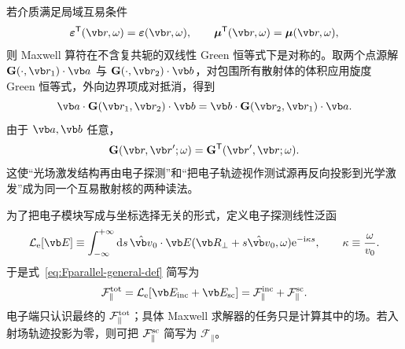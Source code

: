 若介质满足局域互易条件
\begin{equation}
 \boldsymbol\varepsilon^{\mathsf T}(\vb r,\omega)
 =\boldsymbol\varepsilon(\vb r,\omega),
 \qquad
 \boldsymbol\mu^{\mathsf T}(\vb r,\omega)
 =\boldsymbol\mu(\vb r,\omega),
 \label{eq:reciprocal-epsilon}
\end{equation}
则 Maxwell 算符在不含复共轭的双线性 Green 恒等式下是对称的。取两个点源解 $\mathbf G(\cdot,\vb r_1)\cdot\vb a$ 与
$\mathbf G(\cdot,\vb r_2)\cdot\vb b$，对包围所有散射体的体积应用旋度 Green 恒等式，外向边界项成对抵消，得到
\begin{equation}
 \vb a\cdot\mathbf G(\vb r_1,\vb r_2)\cdot\vb b
 =\vb b\cdot\mathbf G(\vb r_2,\vb r_1)\cdot\vb a.
\end{equation}
由于 $\vb a,\vb b$ 任意，
\begin{equation}
 {
 \mathbf G(\vb r,\vb r';\omega)
 =\mathbf G^{\mathsf T}(\vb r',\vb r;\omega).}
 \label{eq:green-reciprocity}
\end{equation}
这使“光场激发结构再由电子探测”和“把电子轨迹视作测试源再反向投影到光学激发”成为同一个互易散射核的两种读法。

为了把电子模块写成与坐标选择无关的形式，定义电子探测线性泛函
\begin{equation}
{
\mathcal L_{\rm e}[\vb E]
\equiv
\int_{-\infty}^{+\infty}\dd s\,
\hat{\vb v}_0\cdot
\vb E(\vb R_\perp+s\hat{\vb v}_0,\omega)
\ee^{-\ii\kappa s},
\qquad
\kappa\equiv\frac{\omega}{v_0}.}
\label{eq:electron-detection-functional}
\end{equation}
于是式~\cref{eq:Fparallel-general-def} 简写为
\begin{equation}
{
\mathcal F_{\parallel}^{\rm tot}=\mathcal L_{\rm e}[\vb E_{\rm inc}+\vb E_{\rm sc}]
=\mathcal F_{\parallel}^{\rm inc}+\mathcal F_{\parallel}^{\rm sc}.}
\label{eq:F-as-functional}
\end{equation}
电子端只认识最终的 $\mathcal F_{\parallel}^{\rm tot}$；具体 Maxwell 求解器的任务只是计算其中的场。若入射场轨迹投影为零，则可把 $\mathcal F_{\parallel}^{\rm sc}$ 简写为 $\mathcal F_{\parallel}$。


